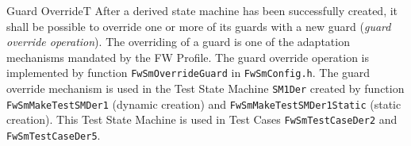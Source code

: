 \documentclass[a4paper,10pt]{article}
\newenvironment{fw_req}[6]
{\addtocounter{subsubsection}{1}
	\hspace{0.2cm}\textbf{FW-\arabic{section}.\arabic{subsection}.\arabic{subsubsection}/#2
	\hspace{0.8cm} #1}
	\vspace{-10pt}
\begin{longtable}{p{2.7cm}P{8.5cm}}
\hline
\textsc{Requirement} & #3 \\
\textsc{Justification} & #4 \\
\textsc{Implementation} & #5  \\ 
\textsc{Verification} & #6  \\
\hline
}
{\end{longtable}}
\begin{document}
\begin{fw_req}{Guard Override}{T}
{After a derived state machine has been successfully created, it shall be 
possible to override one or more of its guards with a new guard (\emph{guard override operation}).}
{The overriding of a guard is one of the adaptation mechanisms mandated 
by the FW Profile.}
{The guard override operation is implemented by function 
\texttt{FwSmOverrideGuard} in \texttt{FwSmConfig.h}.} 
{The guard override mechanism is used in the Test State Machine 
\texttt{SM1Der} created by function \texttt{FwSmMakeTestSMDer1} (dynamic creation) and 
\texttt{FwSmMakeTestSMDer1Static} (static creation). This Test State Machine is used in 
Test Cases \texttt{FwSmTestCaseDer2} and \texttt{FwSmTestCaseDer5}.}
\end{fw_req}
\end{document}
